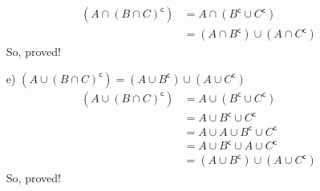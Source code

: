 \begin{enumerate}
      \begin{align}
            (A\cap(B\cap C)^\mathsf{c})
            &= A\cap(B^\mathsf{c}\cup C^\mathsf{c}) \\
            &= (A\cap B^\mathsf{c})\cup(A\cap C^\mathsf{c})
      \end{align} 
      So, proved!
\item[e)] $(A\cup(B\cap C)^\mathsf{c}) = (A\cup B^\mathsf{c})\cup(A\cup C^\mathsf{c})$ \\
      \begin{align}
            (A\cup(B\cap C)^\mathsf{c})
            &= A\cup(B^\mathsf{c}\cup C^\mathsf{c}) \\
            &= A\cup B^\mathsf{c}\cup C^\mathsf{c} \\
            &= A\cup A\cup B^\mathsf{c}\cup C^\mathsf{c} \\
            &= A\cup B^\mathsf{c}\cup A\cup C^\mathsf{c} \\
            &= (A\cup B^\mathsf{c})\cup (A\cup C^\mathsf{c})
      \end{align} 
      So, proved!
\end{enumerate}